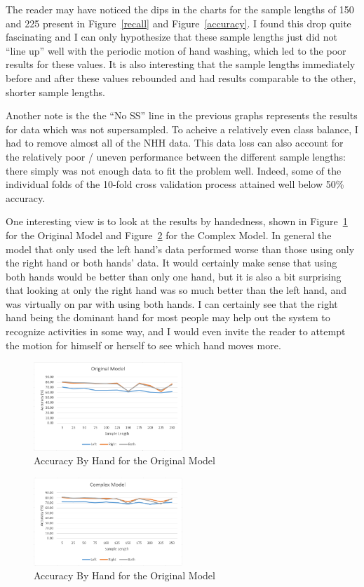 \documentclass[]{report}
\begin{document}
The reader may have noticed the dips in the charts for the sample lengths of 150 and 225 present in Figure~\ref{recall} and Figure~\ref{accuracy}. I found this drop quite fascinating and I can only hypothesize that these sample lengths just did not ``line up'' well with the periodic motion of hand washing, which led to the poor results for these values. It is also interesting that the sample lengths immediately before and after these values rebounded and had results comparable to the other, shorter sample lengths.

Another note is the the ``No SS'' line in the previous graphs represents the results for data which was not supersampled. To acheive a relatively even class balance, I had to remove almost all of the NHH data. This data loss can also account for the relatively poor / uneven performance between the different sample lengths: there simply was not enough data to fit the problem well. Indeed, some of the individual folds of the 10-fold cross validation process attained well below 50\% accuracy.

One interesting view is to look at the results by handedness, shown in Figure~\ref{handedness-original} for the Original Model and Figure~\ref{handedness-complex} for the Complex Model. In general the model that only used the left hand's data performed worse than those using only the right hand or both hands' data. It would certainly make sense that using both hands would be better than only one hand, but it is also a bit surprising that looking at only the right hand was so much better than the left hand, and was virtually on par with using both hands. I can certainly see that the right hand being the dominant hand for most people may help out the system to recognize activities in some way, and I would even invite the reader to attempt the motion for himself or herself to see which hand moves more.

\begin{figure}
	\centering
	\includegraphics[width=0.5\textwidth]{../images/handed2o}
	\caption{Accuracy By Hand for the Original Model}
	\label{handedness-original}
\end{figure}
\begin{figure}
	\centering
	\includegraphics[width=0.5\textwidth]{../images/handed2c}
	\caption{Accuracy By Hand for the Original Model}
	\label{handedness-complex}
\end{figure}
\end{document}
